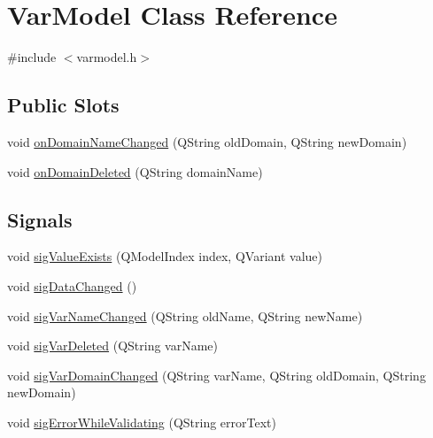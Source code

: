 \hypertarget{class_var_model}{
\section{VarModel Class Reference}
\label{class_var_model}
}


{\ttfamily \#include $<$varmodel.h$>$}

\subsection*{Public Slots}
\begin{DoxyCompactItemize}
\item 
void \hyperlink{class_var_model_ae5a41c90042712fa845c20775f4d5f46}{onDomainNameChanged} (QString oldDomain, QString newDomain)
\item 
void \hyperlink{class_var_model_a1846bab34f6522f741d8287a66a3ed94}{onDomainDeleted} (QString domainName)
\end{DoxyCompactItemize}
\subsection*{Signals}
\begin{DoxyCompactItemize}
\item 
void \hyperlink{class_var_model_aaaea7965aa15b66fc68a77660e9acb09}{sigValueExists} (QModelIndex index, QVariant value)
\item 
void \hyperlink{class_var_model_afd7ffb378489c4f12b3a878c8bda8816}{sigDataChanged} ()
\item 
void \hyperlink{class_var_model_a821ef837523aa2d0aa2e78de654ae92b}{sigVarNameChanged} (QString oldName, QString newName)
\item 
void \hyperlink{class_var_model_a10cde3b5b7e548ccea63a2dc9b14c5e5}{sigVarDeleted} (QString varName)
\item 
void \hyperlink{class_var_model_a5c8fdfe4f2652d0a030d5b2ecc1f7375}{sigVarDomainChanged} (QString varName, QString oldDomain, QString newDomain)
\item 
void \hyperlink{class_var_model_a8b77cd61d303225b596b3da7fa41babe}{sigErrorWhileValidating} (QString errorText)
\end{DoxyCompactItemize}
